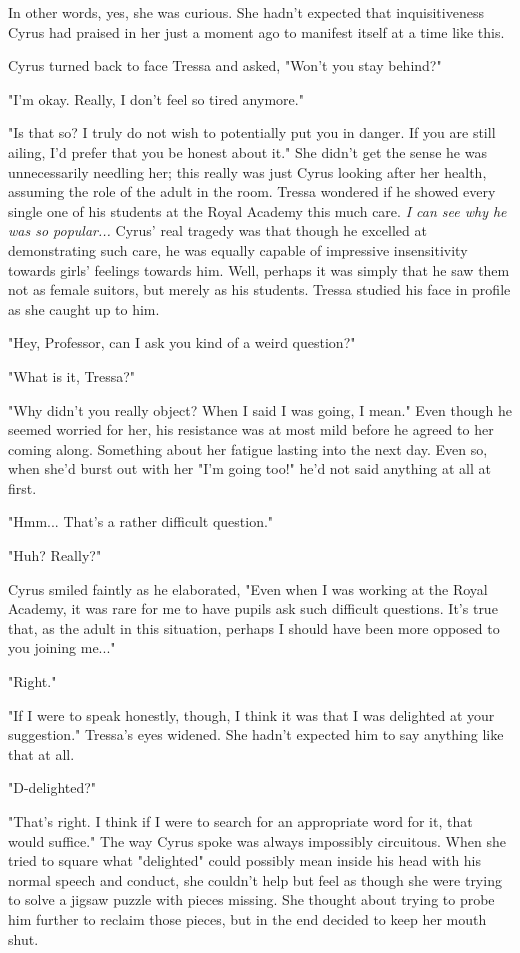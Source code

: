 In other words, yes, she was curious. She hadn't expected that inquisitiveness Cyrus had praised in her just a moment ago to manifest itself at a time like this.

Cyrus turned back to face Tressa and asked, "Won't you stay behind?"

"I'm okay. Really, I don't feel so tired anymore."

"Is that so? I truly do not wish to potentially put you in danger. If you are still ailing, I'd prefer that you be honest about it." She didn't get the sense he was unnecessarily needling her; this really was just Cyrus looking after her health, assuming the role of the adult in the room. Tressa wondered if he showed every single one of his students at the Royal Academy this much care. \emph{I can see why he was so popular...} Cyrus' real tragedy was that though he excelled at demonstrating such care, he was equally capable of impressive insensitivity towards girls' feelings towards him. Well, perhaps it was simply that he saw them not as female suitors, but merely as his students. Tressa studied his face in profile as she caught up to him.

"Hey, Professor, can I ask you kind of a weird question?"

"What is it, Tressa?"

"Why didn't you really object? When I said I was going, I mean." Even though he seemed worried for her, his resistance was at most mild before he agreed to her coming along. Something about her fatigue lasting into the next day. Even so, when she'd burst out with her "I'm going too!" he'd not said anything at all at first.

"Hmm... That's a rather difficult question."

"Huh? Really?"

Cyrus smiled faintly as he elaborated, "Even when I was working at the Royal Academy, it was rare for me to have pupils ask such difficult questions. It's true that, as the adult in this situation, perhaps I should have been more opposed to you joining me..."

"Right."

"If I were to speak honestly, though, I think it was that I was delighted at your suggestion." Tressa's eyes widened. She hadn't expected him to say anything like that at all.

"D-delighted?"

"That's right. I think if I were to search for an appropriate word for it, that would suffice." The way Cyrus spoke was always impossibly circuitous. When she tried to square what "delighted" could possibly mean inside his head with his normal speech and conduct, she couldn't help but feel as though she were trying to solve a jigsaw puzzle with pieces missing. She thought about trying to probe him further to reclaim those pieces, but in the end decided to keep her mouth shut.

